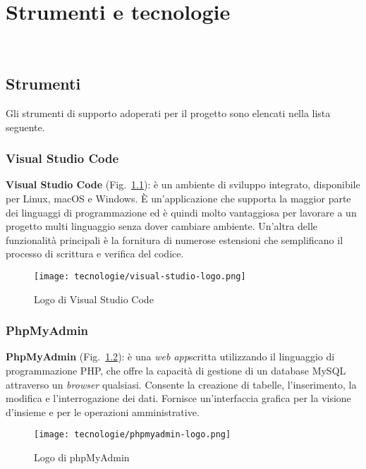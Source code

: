 \chapter{Strumenti e tecnologie}
\label{cap:strumenti-tecnologie}

\\

\section{Strumenti}
\label{sec:strumenti}
Gli strumenti di supporto adoperati per il progetto sono elencati nella lista seguente.

\subsection{Visual Studio Code}
\textbf{Visual Studio Code} (Fig.~\ref{fig:logo-vscode}): è un ambiente di sviluppo integrato, disponibile per Linux, macOS e Windows. 
È un'applicazione che supporta la maggior parte dei linguaggi di programmazione ed è quindi molto vantaggiosa per lavorare a un progetto multi linguaggio senza dover cambiare ambiente.
Un'altra delle funzionalità principali è la fornitura di numerose estensioni che semplificano il processo di scrittura e verifica del codice.

\begin{figure}[!h] 
    \centering 
    \texttt{[image: tecnologie/visual-studio-logo.png]} 
    \caption{Logo di Visual Studio Code}
    \label{fig:logo-vscode}
  \end{figure}

\newpage

\subsection{PhpMyAdmin}
\textbf{PhpMyAdmin} (Fig.~\ref{fig:logo-phpmyadmin}): è una \emph{web app}\glsfirstoccur scritta utilizzando il linguaggio di programmazione PHP, che offre la capacità di gestione di un database MySQL attraverso un \emph{browser} qualsiasi. Consente la creazione di tabelle, l'inserimento, la modifica e l'interrogazione dei dati.
Fornisce un'interfaccia grafica per la visione d'insieme e per le operazioni amministrative.

\begin{figure}[!h] 
      \centering 
      \texttt{[image: tecnologie/phpmyadmin-logo.png]} 
      \caption{Logo di phpMyAdmin}
    \label{fig:logo-phpmyadmin}
  \end{figure}


